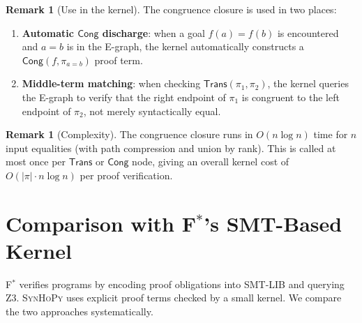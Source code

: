 \documentclass[11pt,a4paper]{report}
\theoremstyle{definition}
\newtheorem{remark}[definition]{Remark}
\theoremstyle{plain}
\newcommand{\Trans}{\mathsf{Trans}}
\newcommand{\Cong}{\mathsf{Cong}}
\newcommand{\fstar}{F$^{*}$}
\newcommand{\synhopy}{\textsc{SynHoPy}}
\begin{document}
\begin{remark}[Use in the kernel]
The congruence closure is used in two places:
\begin{enumerate}
  \item \textbf{Automatic $\Cong$ discharge}: when a goal $f(a) = f(b)$
    is encountered and $a = b$ is in the E-graph, the kernel
    automatically constructs a $\Cong(f, \pi_{a=b})$ proof term.
  \item \textbf{Middle-term matching}: when checking $\Trans(\pi_1, \pi_2)$,
    the kernel queries the E-graph to verify that the right endpoint of
    $\pi_1$ is congruent to the left endpoint of $\pi_2$, not merely
    syntactically equal.
\end{enumerate}
\end{remark}

\begin{remark}[Complexity]
The congruence closure runs in $O(n \log n)$ time for $n$ input
equalities (with path compression and union by rank). This is called
at most once per $\Trans$ or $\Cong$ node, giving an overall kernel
cost of $O(|\pi| \cdot n \log n)$ per proof verification.
\end{remark}


\section{Comparison with \fstar{}'s SMT-Based Kernel}
\label{sec:fstar-comparison}

\fstar{} verifies programs by encoding proof obligations into SMT-LIB
and querying Z3. \synhopy{} uses explicit proof terms checked by a
small kernel. We compare the two approaches systematically.
\end{document}
